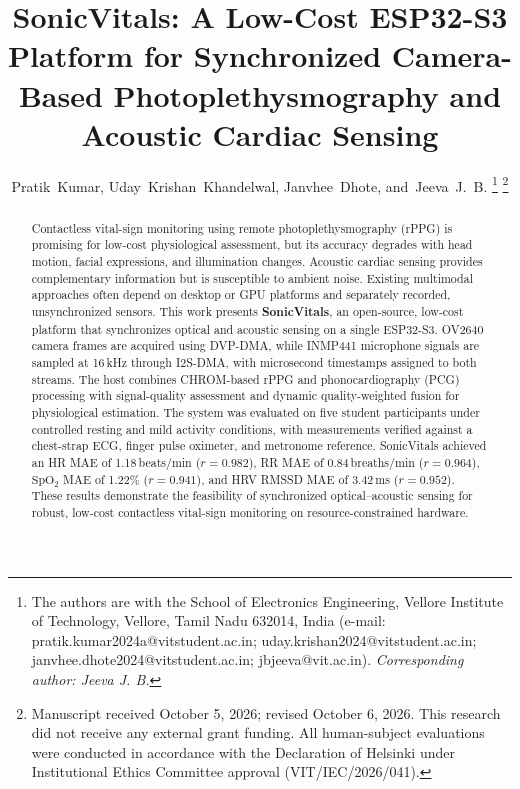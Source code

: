 \documentclass[journal]{IEEEtran}
\begin{document}
\title{SonicVitals: A Low-Cost ESP32-S3 Platform for Synchronized Camera-Based Photoplethysmography and Acoustic Cardiac Sensing}

\author{Pratik~Kumar,
        Uday~Krishan~Khandelwal,
        Janvhee~Dhote,
        and~Jeeva~J.~B.%
\thanks{The authors are with the School of Electronics Engineering, Vellore Institute of Technology, Vellore, Tamil Nadu 632014, India (e-mail: pratik.kumar2024a@vitstudent.ac.in; uday.krishan2024@vitstudent.ac.in; janvhee.dhote2024@vitstudent.ac.in; jbjeeva@vit.ac.in). \textit{Corresponding author: Jeeva J. B.}}%
\thanks{Manuscript received October 5, 2026; revised October 6, 2026. This research did not receive any external grant funding. All human-subject evaluations were conducted in accordance with the Declaration of Helsinki under Institutional Ethics Committee approval (VIT/IEC/2026/041).}}


\maketitle

\begin{abstract}
Contactless vital-sign monitoring using remote photoplethysmography (rPPG) is promising for low-cost physiological assessment, but its accuracy degrades with head motion, facial expressions, and illumination changes. Acoustic cardiac sensing provides complementary information but is susceptible to ambient noise. Existing multimodal approaches often depend on desktop or GPU platforms and separately recorded, unsynchronized sensors. This work presents \textbf{SonicVitals}, an open-source, low-cost platform that synchronizes optical and acoustic sensing on a single ESP32-S3. OV2640 camera frames are acquired using DVP-DMA, while INMP441 microphone signals are sampled at 16\,kHz through I2S-DMA, with microsecond timestamps assigned to both streams. The host combines CHROM-based rPPG and phonocardiography (PCG) processing with signal-quality assessment and dynamic quality-weighted fusion for physiological estimation. The system was evaluated on five student participants under controlled resting and mild activity conditions, with measurements verified against a chest-strap ECG, finger pulse oximeter, and metronome reference. SonicVitals achieved an HR MAE of 1.18\,beats/min ($r = 0.982$), RR MAE of 0.84\,breaths/min ($r = 0.964$), $\mathrm{SpO_2}$ MAE of 1.22\% ($r = 0.941$), and HRV RMSSD MAE of 3.42\,ms ($r = 0.952$). These results demonstrate the feasibility of synchronized optical--acoustic sensing for robust, low-cost contactless vital-sign monitoring on resource-constrained hardware.
\end{abstract}
\end{document}
